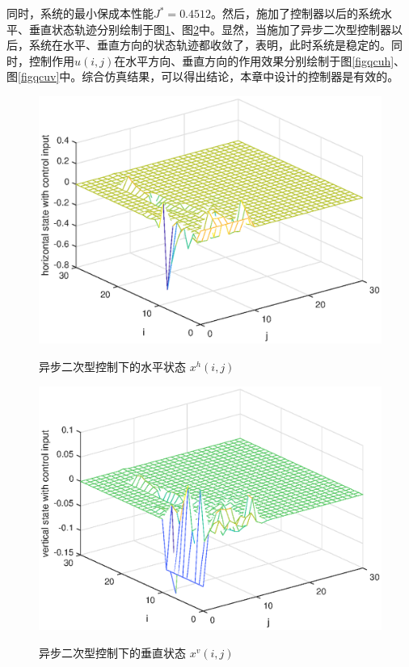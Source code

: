 	同时，系统的最小保成本性能$J^{*}=0.4512$。然后，施加了控制器以后的系统水平、垂直状态轨迹分别绘制于图\ref{figqchstate1}、图\ref{figqcvstate1}中。显然，当施加了异步二次型控制器以后，系统在水平、垂直方向的状态轨迹都收敛了，表明，此时系统是稳定的。同时，控制作用$u(i,j)$在水平方向、垂直方向的作用效果分别绘制于图\ref{figqcuh}、图\ref{figqcuv}中。综合仿真结果，可以得出结论，本章中设计的控制器是有效的。
	\begin{figure}[!htb]
		\centering\includegraphics[scale=0.6]{./figures/qc/simulation/hstate.eps}\\ 
		\caption{异步二次型控制下的水平状态 $x^{h}(i,j)$}
		\label{figqchstate1}
	\end{figure}
	
	\begin{figure}[!htb]
		\centering\includegraphics[scale=0.6]{./figures/qc/simulation/vstate.eps}\\ 
		\caption{异步二次型控制下的垂直状态 $x^{v}(i,j)$}
		\label{figqcvstate1}
	\end{figure}
	
